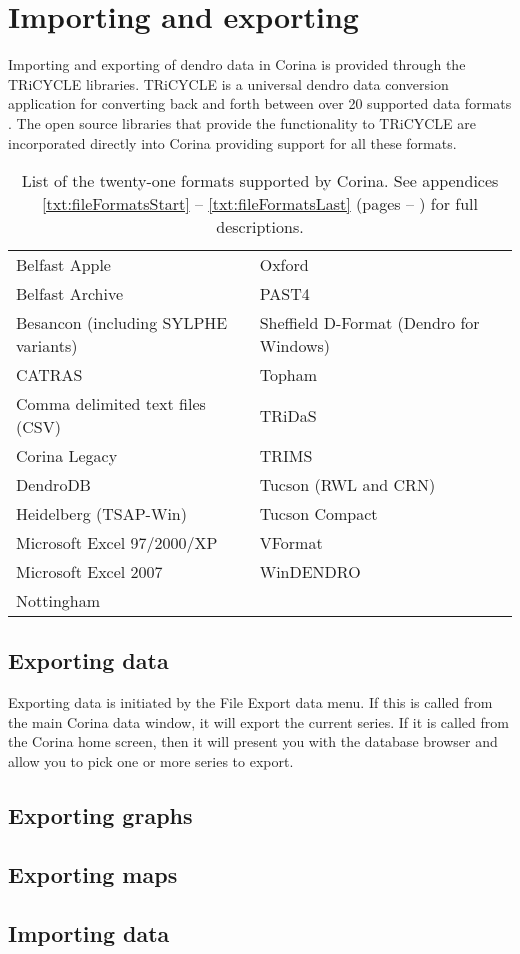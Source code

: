 \chapter{Importing and exporting}

Importing and exporting of dendro data in Corina is provided through the TRiCYCLE libraries.  TRiCYCLE is a universal dendro data conversion application for converting back and forth between over 20 supported data formats \citep{tricycle}.  The open source libraries that provide the functionality to TRiCYCLE are incorporated directly into Corina providing support for all these formats.  

\begin{table*}[htbp]
\centering
\label{txt:formatList}
\begin{tabular*}{0.8\textwidth}{ll}
\toprule
Belfast Apple & Oxford \\
Belfast Archive & PAST4\\
Besancon (including SYLPHE variants) &  Sheffield D-Format (Dendro for Windows)\\
CATRAS & Topham \\
Comma delimited text files (CSV) &  TRiDaS\\
Corina Legacy &  TRIMS\\
DendroDB & Tucson (RWL and CRN)\\
Heidelberg (TSAP-Win) &  Tucson Compact\\
Microsoft Excel 97/2000/XP&  VFormat\\
Microsoft Excel 2007 & WinDENDRO\\
Nottingham &  \\
\bottomrule
\end{tabular*}
\caption{List of the twenty-one formats supported by Corina. See appendices \ref{txt:fileFormatsStart} -- \ref{txt:fileFormatsLast} (pages \pageref{txt:fileFormatsStart} -- \pageref{txt:fileFormatsEnd}) for full descriptions.}
\end{table*}



\section{Exporting data}

Exporting data is initiated by the File \MVRightarrow Export data menu.  If this is called from the main Corina data window, it will export the current series.  If it is called from the Corina home screen, then it will present you with the database browser and allow you to pick one or more series to export.


\section{Exporting graphs}




\section{Exporting maps}



\section{Importing data}